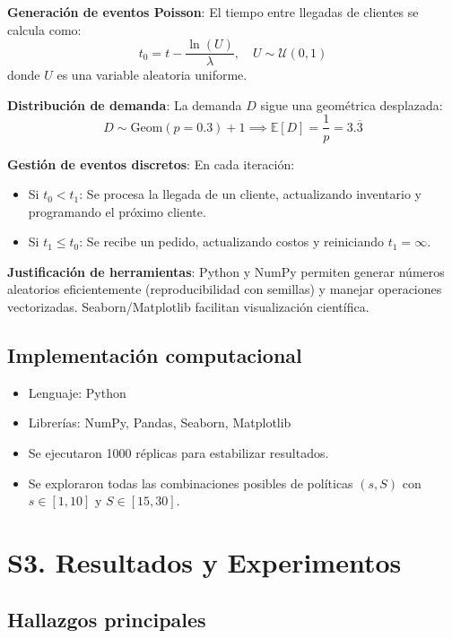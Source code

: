 \documentclass{report}
\begin{document}
\textbf{Generación de eventos Poisson}:  
El tiempo entre llegadas de clientes se calcula como:  
\[
t_0 = t - \frac{\ln(U)}{\lambda}, \quad U \sim \mathcal{U}(0,1)
\]  
donde \(U\) es una variable aleatoria uniforme.  

\textbf{Distribución de demanda}:  
La demanda \(D\) sigue una geométrica desplazada:  
\[
D \sim \text{Geom}(p=0.3) + 1 \implies \mathbb{E}[D] = \frac{1}{p} = 3.\overline{3}
\]  

\textbf{Gestión de eventos discretos}:  
En cada iteración:  
\begin{itemize}  
\item Si \(t_0 < t_1\): Se procesa la llegada de un cliente, actualizando inventario y programando el próximo cliente.  
\item Si \(t_1 \leq t_0\): Se recibe un pedido, actualizando costos y reiniciando \(t_1 = \infty\).  
\end{itemize}  

\textbf{Justificación de herramientas}:  
Python y NumPy permiten generar números aleatorios eficientemente (reproducibilidad con semillas) y manejar operaciones vectorizadas. Seaborn/Matplotlib facilitan visualización científica.  


\subsection*{Implementación computacional}

\begin{itemize}
\item Lenguaje: Python
\item Librerías: NumPy, Pandas, Seaborn, Matplotlib
\item Se ejecutaron 1000 réplicas para estabilizar resultados.
\item Se exploraron todas las combinaciones posibles de políticas \((s, S)\) con 
$ s \in [1, 10] $ y $ S \in [15, 30] $.
\end{itemize}


\section*{S3. Resultados y Experimentos}

\subsection*{Hallazgos principales}
\end{document}
